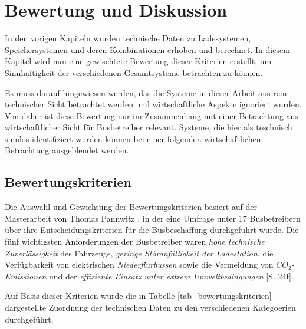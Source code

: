 \chapter{Bewertung und Diskussion} %
In den vorigen Kapiteln wurden technische Daten zu Ladesystemen, Speichersystemen und deren Kombinationen erhoben und berechnet. In diesem Kapitel wird nun eine gewischtete Bewertung dieser Kriterien erstellt, um Sinnhaftigkeit der verschiedenen Gesamtsysteme betrachten zu können.

Es muss darauf hingewiesen werden, das die Systeme in dieser Arbeit aus rein technischer Sicht betrachtet werden und wirtschaftliche Aspekte ignoriert wurden. Von daher ist diese Bewertung nur im Zusammenhang mit einer Betrachtung aus wirtschaftlicher Sicht für Busbetreiber relevant. Systeme, die hier als teschnisch sinnlos identifiziert wurden können bei einer folgenden wirtschaftlichen Betrachtung ausgeblendet werden.

\section{Bewertungskriterien}
Die Auswahl und Gewichtung der Bewertungskriterien basiert auf der Masterarbeit von Thomas Pannwitz , in der eine Umfrage unter 17 Busbetreibern über ihre Entscheidungskriterien für die Busbeschaffung durchgeführt wurde. Die fünf wichtigsten Anforderungen der Busbetreiber waren \emph{hohe technische Zuverlässigkeit} des Fahrzeugs, \emph{geringe Störanfälligkeit der Ladestation}, die Verfügbarkeit von elektrischen \emph{Niederflurbussen} sowie die Vermeidung von \emph{$CO_2$-Emissionen} und der \emph{effiziente Einsatz unter extrem Umweltbedingungen} \cite{pannwitz2014}[S. 24f].

Auf Basis dieser Kriterien wurde die in Tabelle \ref{tab_bewertungskriterien} dargestellte Zuordnung der technischen Daten zu den verschiedenen Kategoerien durchgeführt.



